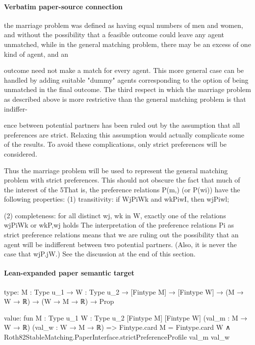 \documentclass[10pt]{article}
\begin{document}
\paragraph{Verbatim paper-source connection}
\begin{ReviewVerbatim}
the marriage problem was defined as having equal numbers of men and women, and
without the possibility that a feasible outcome could leave any agent unmatched, while
in the general matching problem, there may be an excess of one kind of agent, and an

outcome need not make a match for every agent. This more general case can be
handled by adding suitable "dummy" agents corresponding to the option of being
unmatched in the final outcome. The third respect in which the marriage problem as
described above is more restrictive than the general matching problem is that indiffer-

ence between potential partners has been ruled out by the assumption that all
preferences are strict. Relaxing this assumption would actually complicate some of the
results. To avoid these complications, only strict preferences will be considered.

Thus the marriage problem will be used to represent the general matching problem
with strict preferences. This should not obscure the fact that much of the interest of the
5That is, the preference relations P(m,) (or P(wi)) have the following properties:
(1) transitivity: if WjPiWk and wkPiwI, then wjPiwl;

(2) completeness: for all distinct wj, wk in W, exactly one of the relations wjPiWk or wkP,wj holds
The interpretation of the preference relations Pi as strict preference relations means that we are ruling out
the possibility that an agent will be indifferent between two potential partners. (Also, it is never the case that
wjP.jW.) See the discussion at the end of this section.
\end{ReviewVerbatim}



\paragraph{Lean-expanded paper semantic target}
\begin{ReviewVerbatim}
type:
{M : Type u_1} → {W : Type u_2} → [Fintype M] → [Fintype W] → (M → W → ℝ) → (W → M → ℝ) → Prop

value:
fun {M : Type u_1} {W : Type u_2} [Fintype M] [Fintype W] (val_m : M → W → ℝ) (val_w : W → M → ℝ) =>
  Fintype.card M = Fintype.card W ∧ Roth82StableMatching.PaperInterface.strictPreferenceProfile val_m val_w
\end{ReviewVerbatim}
\end{document}
